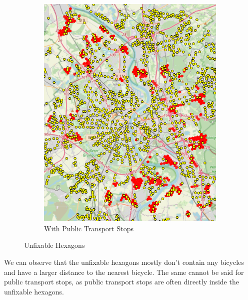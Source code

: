 \begin{figure}
\begin{subfigure}[b]{0.30\textwidth}
         \includegraphics[width=\textwidth]{Figures/results/problematic_hexagons/unfixable_with_stops.png}
         \caption{With Public Transport Stops}
         \label{fig:unfixable_with_stops}
     \end{subfigure}
     \hfill
     \caption{Unfixable Hexagons}
     \label{fig:unfixable_hexagons}
\end{figure}
We can observe that the unfixable hexagons mostly don't contain any bicycles and have a larger distance to the nearest bicycle.
The same cannot be said for public transport stops, as public transport stops are often directly inside the unfixable hexagons.

